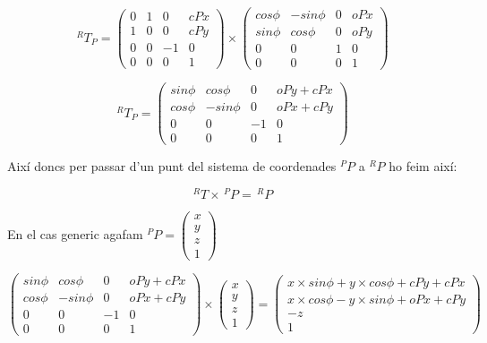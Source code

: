 $$ ^RT_P = 
\left( \begin{array}{ccc|c}
0 & 1 &  0 & cPx\\
1 & 0 &  0 & cPy\\
0 & 0 & -1 &   0\\
\hline
0 & 0 &  0 & 1
\end{array} \right) \times
\left( \begin{array}{ccc|c}
cos \phi & -sin \phi &  0 & oPx\\
sin \phi &  cos \phi &  0 & oPy\\
0        &         0 &  1 &   0\\
\hline
0 & 0 &  0 & 1
\end{array} \right) $$

$$ ^RT_P = 
\left( \begin{array}{ccc|c}
sin \phi &  cos \phi &  0 & oPy + cPx\\
cos \phi & -sin \phi &  0 & oPx + cPy\\
0        &         0 & -1 &   0\\
\hline
0 & 0 &  0 & 1
\end{array} \right)$$

Així doncs per passar d'un punt del sistema de coordenades $^PP$ a $^RP$ ho feim així:

$$^RT \times \,^PP = \,^RP$$

En el cas generic agafam $^PP = 
\left( \begin{array}{c}
x \\
y \\
z \\
\hline
1
\end{array} \right)$

$$
\left( \begin{array}{ccc|c}
sin \phi &  cos \phi &  0 & oPy + cPx\\
cos \phi & -sin \phi &  0 & oPx + cPy\\
0        &         0 & -1 &   0\\
\hline
0 & 0 &  0 & 1
\end{array} \right)
\times
\left( \begin{array}{c}
x \\
y \\
z \\
\hline
1
\end{array} \right)
=
\left( \begin{array}{c}
x\times sin \phi + y \times cos \phi + cPy + cPx \\
x\times cos \phi - y \times sin \phi + oPx + cPy \\
-z \\
\hline
1
\end{array} \right)
$$

